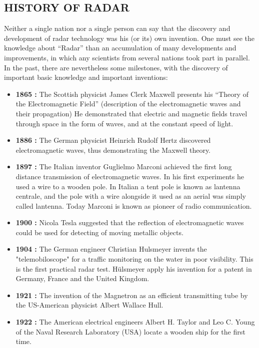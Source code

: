 \documentclass[12pt]{article} %
\begin{document}
\subsection{HISTORY OF RADAR}
 Neither a single nation nor a single person can say that the discovery and development of radar technology was his (or its) own invention. One must see the knowledge about “Radar” than an accumulation of many developments and improvements, in which any scientists from several nations took part in parallel. In the past, there are nevertheless some milestones, with the discovery of important basic knowledge and important inventions:
\begin{itemize}
\item \textbf {1865  :} The Scottish physicist James Clerk Maxwell presents his “Theory of the Electromagnetic Field” (description of the electromagnetic waves and their propagation) He demonstrated that electric and magnetic fields travel through space in the form of waves, and at the constant speed of light.

\item \textbf {1886 : }The German physicist Heinrich Rudolf Hertz  discovered electromagnetic waves, thus demonstrating the Maxwell theory.

\item \textbf { 1897 :  }The Italian inventor Guglielmo Marconi achieved the first long distance transmission of electromagnetic waves. In his first experiments he used a wire to a wooden pole. In Italian a tent pole is known as lantenna centrale, and the pole with a wire alongside it used as an aerial was simply called lantenna. Today Marconi is known as pioneer of radio communication.

\item \textbf {1900 :  }Nicola Tesla suggested that the reflection of electromagnetic waves could be used for detecting of moving metallic objects.

\item \textbf {1904 :  }The German engineer Christian Hulsmeyer invents the "telemobiloscope" for a traffic monitoring on the water in poor visibility. This is the first practical radar test. Hülsmeyer apply his invention for a patent in Germany, France and the United Kingdom.

\item \textbf {1921 :  }The invention of the Magnetron as an efficient transmitting tube by the US-American physicist Albert Wallace Hull.

\item \textbf {1922 : }The American electrical engineers Albert H. Taylor and Leo C. Young of the Naval Research Laboratory (USA) locate a wooden ship for the first time.


\end{itemize}
\end{document}

